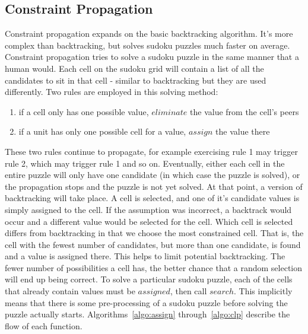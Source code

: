 \subsection{Constraint Propagation}
Constraint propagation expands on the basic backtracking algorithm. It's more complex than backtracking, but solves sudoku puzzles
much faster on average. Constraint propagation tries to solve a sudoku puzzle in the same manner that a human would. Each cell on
the sudoku grid will contain a list of all the candidates to sit in that cell - similar to backtracking but they are used differently.
Two rules are employed in this solving method:
\begin{enumerate}
    \item if a cell only has one possible value, $eliminate$ the value from the cell's peers
    \item if a unit has only one possible cell for a value, $assign$ the value there
\end{enumerate}
These two rules continue to propagate, for example exercising rule 1 may trigger rule 2, which may trigger rule 1 and so on. Eventually,
either each cell in the entire puzzle will only have one candidate (in which case the puzzle is solved), or the propagation stops and the
puzzle is not yet solved. At that point, a version of backtracking will take place. A cell is selected, and one of it's candidate values
is simply assigned to the cell. If the assumption was incorrect, a backtrack would occur and a different value would be selected for the cell.
Which cell is selected differs from backtracking in that we choose the most constrained cell. That is, the cell with the fewest number of
candidates, but more than one candidate, is found and a value is assigned there. This helps to limit potential backtracking. The fewer number
of possibilities a cell has, the better chance that a random selection will end up being correct. 
To solve a particular sudoku puzzle, each of the cells that already contain values must be $assigned$, then call $search$. This implicitly means
that there is some pre-processing of a sudoku puzzle before solving the puzzle actually starts.
Algorithms~\ref{algo:assign} through~\ref{algo:clp} describe the flow of each function.
